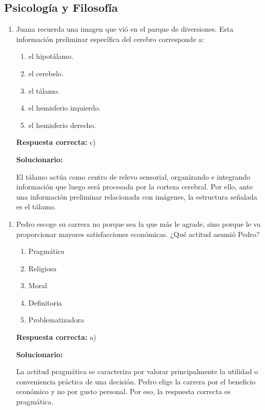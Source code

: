 \subsection*{Psicología y Filosofía}

\begin{enumerate}
	
	\item Juana recuerda una imagen que vió en el parque de diversiones. Esta información preliminar específica del cerebro corresponde a:
	
	\begin{enumerate}[label=\alph*)]
		\item el hipotálamo.
		\item el cerebelo.
		\item el tálamo.
		\item el hemisferio izquierdo.
		\item el hemisferio derecho.
	\end{enumerate}
	
	\textbf{Respuesta correcta:} c)
	
	\vspace{2mm}
	\textbf{Solucionario:}
	
	El tálamo actúa como centro de relevo sensorial, organizando e integrando información que luego será procesada por la corteza cerebral. Por ello, ante una información preliminar relacionada con imágenes, la estructura señalada es el tálamo.
	
\end{enumerate}

\begin{enumerate}[resume]
	
	\item Pedro escoge su carrera no porque sea la que más le agrade, sino porque le va proporcionar mayores satisfacciones económicas. ¿Qué actitud asumió Pedro?
	
	\begin{enumerate}[label=\alph*)]
		\item Pragmática
		\item Religiosa
		\item Moral
		\item Definitoria
		\item Problematizadora
	\end{enumerate}
	
	\textbf{Respuesta correcta:} a)
	
	\vspace{2mm}
	\textbf{Solucionario:}
	
	La actitud pragmática se caracteriza por valorar principalmente la utilidad o conveniencia práctica de una decisión. Pedro elige la carrera por el beneficio económico y no por gusto personal. Por eso, la respuesta correcta es pragmática.
	
\end{enumerate}


